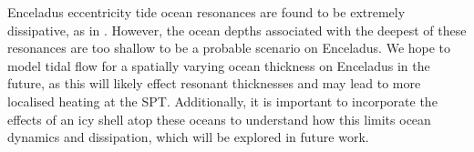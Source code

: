 Enceladus eccentricity tide ocean resonances are found to be extremely dissipative, as in \citet{tyler2011tidal, matsuyama2014tidal}. However, the ocean depths associated with the deepest of these resonances are too shallow to be a probable scenario on Enceladus. We hope to model tidal flow for a spatially varying ocean thickness on Enceladus in the future, as this will likely effect resonant thicknesses and may lead to more localised heating at the SPT. Additionally, it is important to incorporate the effects of an icy shell atop these oceans to understand how this limits ocean dynamics and dissipation, which will be explored in future work. 
